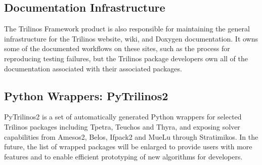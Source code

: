 \subsection{Documentation Infrastructure}

The Trilinos Framework product is also responsible for maintaining the general infrastructure for the Trilinos website, wiki, and Doxygen documentation. It owns some of the documented workflows on these sites, such as the process for reproducing testing failures, but the Trilinos package developers own all of the documentation associated with their associated packages.


\subsection{Python Wrappers: PyTrilinos2}

PyTrilinos2 is a set of automatically generated Python wrappers for selected Trilinos packages including Tpetra, Teuchos and Thyra, and exposing solver capabilities from Amesos2, Belos, Ifpack2 and MueLu through Stratimikos. In the future, the list of wrapped packages will be enlarged to provide users with more features and to enable efficient prototyping of new algorithms for developers.

